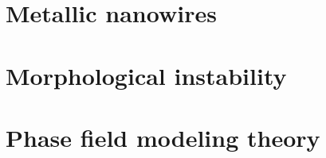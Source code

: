 \section{Metallic nanowires}
    
\section{Morphological instability}
    
\section{Phase field modeling theory}
    

